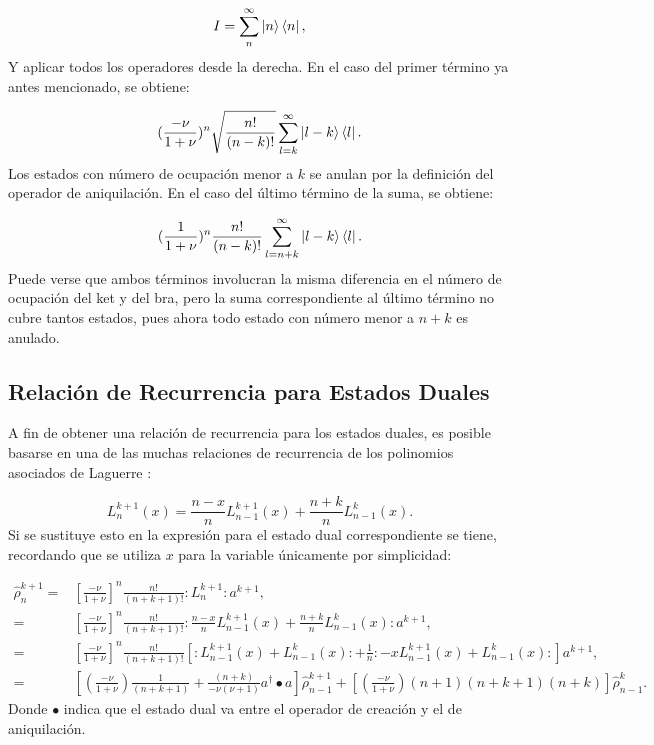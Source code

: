 \documentclass[a4paper,10pt]{report}
\begin{document}
\begin{equation}
I = \sum^\infty _n \Ket{n}\Bra{n},
\end{equation}Y aplicar todos los operadores desde la derecha. En el caso del primer término ya antes mencionado, se obtiene:

\begin{equation}
 (\frac{-\nu}{1+\nu})^n \sqrt{\frac{n!}{(n-k)!}}\sum^\infty _{l=k} \Ket{l-k}\Bra{l}.
\end{equation} Los estados con número de ocupación menor a $k$ se anulan por la definición del operador de aniquilación. En el caso del último término de la suma, se obtiene:

\begin{equation}
(\frac{1}{1+\nu})^n \frac{n!}{(n-k)!}\sum^\infty _{l=n+k} \Ket{l-k}\Bra{l}.
\end{equation} Puede verse que ambos términos involucran la misma diferencia en el número de ocupación del ket y del bra, pero la suma correspondiente al último término no cubre tantos estados, pues ahora todo estado con número menor a $n+k$ es anulado.

\subsection{Relación de Recurrencia para Estados Duales}

A fin de obtener una relación de recurrencia para los estados duales, es posible basarse en una de las muchas relaciones de recurrencia de los polinomios asociados de Laguerre \cite{ArfkenMM}:

\begin{equation}
L_n^{k+1}(x) = \frac{n-x}{n}L_{n-1}^{k+1}(x) + \frac{n+k}{n}L_{n-1}^{k}(x).
\end{equation} Si se sustituye esto en la expresión para el estado dual correspondiente se tiene, recordando que se utiliza $x$ para la variable únicamente por simplicidad:

\begin{align}
\hat{\rho}_n ^{k+1} =& [\frac{-\nu}{1+\nu}]^n \frac{n!}{(n+k+1)!} :L_n^{k+1}:a^{k+1},\\
=&[\frac{-\nu}{1+\nu}]^n\frac{n!}{(n+k+1)!} :\frac{n-x}{n}L_{n-1}^{k+1}(x) + \frac{n+k}{n}L_{n-1}^{k}(x):a^{k+1},\\
=&[\frac{-\nu}{1+\nu}]^n\frac{n!}{(n+k+1)!}[:L_{n-1}^{k+1}(x)+L_{n-1}^{k}(x):+\frac{1}{n}:-xL_{n-1}^{k+1}(x)+L_{n-1}^{k}(x):]a^{k+1},\\
=&[(\frac{-\nu}{1+\nu})\frac{1}{(n+k+1)}+ \frac{(n+k)}{-\nu(\nu+1)}a^\dagger \bullet a]\hat{\rho}_{n-1} ^{k+1} + [(\frac{-\nu}{1+\nu}) (n+1)(n+k+1)(n+k)]\hat{\rho}_{n-1} ^{k}.
\end{align} Donde $\bullet$ indica que el estado dual va entre el operador de creación y el de aniquilación.
\end{document}
